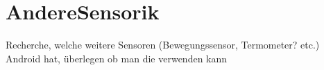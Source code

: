 \section{AndereSensorik}

{\color{red}Recherche, welche weitere Sensoren (Bewegungssensor, Termometer? etc.) Android hat, überlegen ob man die verwenden kann}